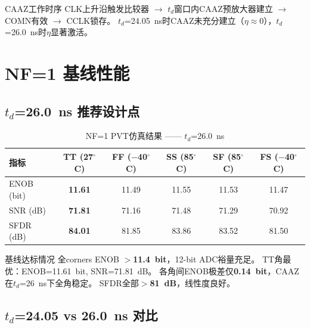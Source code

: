 \documentclass[11pt,a4paper,UTF8]{ctexart}
\newcommand{\keydata}[1]{\textbf{\color{primaryblue}#1}}
\begin{document}
\begin{databox}{CAAZ工作时序}
CLK上升沿触发比较器 $\rightarrow$ $t_d$窗口内CAAZ预放大器建立 $\rightarrow$ COMN有效 $\rightarrow$ CCLK锁存。
$t_d$=24.05~ns时CAAZ未充分建立（$\eta\approx0$），$t_d$=26.0~ns时$\eta$显著激活。
\end{databox}

\section{NF=1 基线性能}
\label{sec:nf1}

\subsection{$t_d$=26.0~ns 推荐设计点}

\begin{table}[htbp]
\centering
\caption{NF=1 PVT仿真结果 —— $t_d$=26.0~ns}
\label{tab:nf1-26}
\small
\setlength{\tabcolsep}{5pt}
\begin{tabular}{lccccc}
\toprule
\textbf{指标} & \textbf{TT (27$^\circ$C)} & \textbf{FF ($-$40$^\circ$C)} & \textbf{SS (85$^\circ$C)} & \textbf{SF (85$^\circ$C)} & \textbf{FS ($-$40$^\circ$C)} \\
\midrule
ENOB (bit) & \keydata{11.61} & 11.49 & 11.55 & 11.53 & 11.47 \\
SNR (dB) & \keydata{71.81} & 71.16 & 71.48 & 71.29 & 70.92 \\
SFDR (dB) & \keydata{84.01} & 81.85 & 83.86 & 83.52 & 81.50 \\
\bottomrule
\end{tabular}
\normalsize
\end{table}

\begin{resultbox}{基线达标情况}
全corners ENOB $>$\textbf{11.4~bit}，12-bit ADC裕量充足。
TT角最优：ENOB=11.61~bit, SNR=71.81~dB。
各角间ENOB极差仅\textbf{0.14~bit}，CAAZ在$t_d$=26~ns下全角稳定。
SFDR全部$>$\textbf{81~dB}，线性度良好。
\end{resultbox}

\subsection{$t_d$=24.05 vs 26.0~ns 对比}
\end{document}
